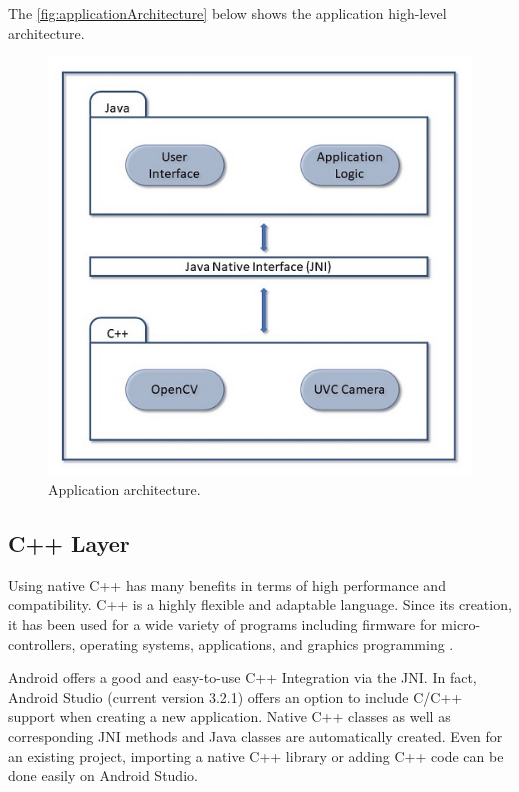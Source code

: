 The \autoref{fig:applicationArchitecture} below shows the application high-level architecture.


\begin{figure}[H]
\centering
\includegraphics{figures/applicationArchitecture.JPG}

\caption[Application architecture]{Application architecture.}\label{fig:applicationArchitecture}
\end{figure}
\subsection{C++ Layer}

Using native C++ has many benefits in terms of high performance and compatibility.
C++ is a highly flexible and adaptable language. Since its creation, it has been used for a wide variety of programs including firmware for micro-controllers, operating systems, applications, and graphics programming \parencite{cpp}.

Android offers a good and easy-to-use C++ Integration via the JNI. In fact, Android Studio (current version 3.2.1) offers an option to include C/C++ support when creating a new application. Native C++ classes as well as corresponding JNI methods and Java classes are automatically created. Even for an existing project, importing a native C++ library or adding C++ code can be done easily on Android Studio.

